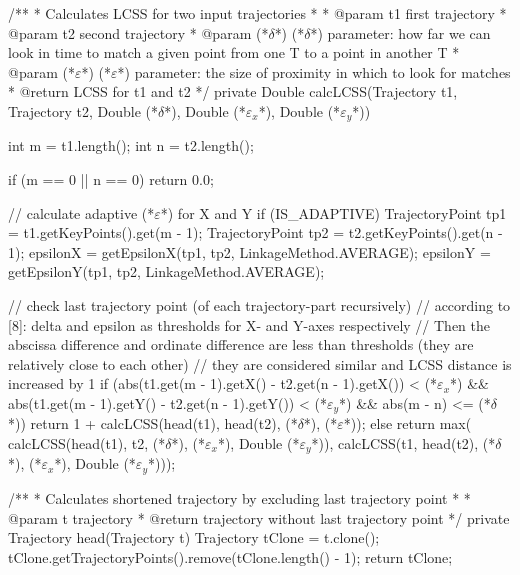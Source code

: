 /**
* Calculates LCSS for two input trajectories
*
* @param t1			first trajectory
* @param t2			second trajectory
* @param (*$\delta$*)			 (*$\delta$*) parameter: how far we can look in time to match a given point from one T to a point in another T
* @param (*$\varepsilon$*)			 (*$\varepsilon$*) parameter: the size of proximity in which to look for matches
* @return 			LCSS for t1 and t2
*/
private Double calcLCSS(Trajectory t1, Trajectory t2, Double (*$\delta$*), Double (*$\varepsilon_x$*), Double (*$\varepsilon_y$*)) {
	int m = t1.length();
	int n = t2.length();
	
	if (m == 0 || n == 0) {
		return 0.0;
	}

//        calculate adaptive (*$\varepsilon$*) for X and Y
	if (IS_ADAPTIVE) {
		TrajectoryPoint tp1 = t1.getKeyPoints().get(m - 1);
		TrajectoryPoint tp2 = t2.getKeyPoints().get(n - 1);
		epsilonX = getEpsilonX(tp1, tp2, LinkageMethod.AVERAGE);
		epsilonY = getEpsilonY(tp1, tp2, LinkageMethod.AVERAGE);
	}
	
//      check last trajectory point (of each trajectory-part recursively)
//      according to [8]: delta and epsilon as thresholds for X- and Y-axes respectively
//      Then the abscissa difference and ordinate difference are less than thresholds (they are relatively close to each other)
//      they are considered similar and LCSS distance is increased by 1
	if (abs(t1.get(m - 1).getX() - t2.get(n - 1).getX()) < (*$\varepsilon_x$*)
			&& abs(t1.get(m - 1).getY() - t2.get(n - 1).getY()) < (*$\varepsilon_y$*)
			&& abs(m - n) <= (*$\delta$*)) {
		return 1 + calcLCSS(head(t1), head(t2), (*$\delta$*), (*$\varepsilon$*));
	} else {
		return max(
			calcLCSS(head(t1), t2, (*$\delta$*), (*$\varepsilon_x$*), Double (*$\varepsilon_y$*)), 
			calcLCSS(t1, head(t2), (*$\delta$*), (*$\varepsilon_x$*), Double (*$\varepsilon_y$*)));
	}
}

/**
* Calculates shortened trajectory by excluding last trajectory point
*
* @param t trajectory
* @return trajectory without last trajectory point
*/
private Trajectory head(Trajectory t) {
	Trajectory tClone = t.clone();
	tClone.getTrajectoryPoints().remove(tClone.length() - 1);
	return tClone;
}
